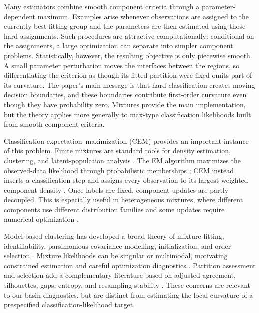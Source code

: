 \documentclass[12pt,a4paper]{article}
\theoremstyle{definition}
\theoremstyle{remark}
\begin{document}
Many estimators combine smooth component criteria through a parameter-dependent
maximum.  Examples arise whenever observations are assigned to the currently
best-fitting group and the parameters are then estimated using those hard
assignments.  Such procedures are attractive computationally: conditional on
the assignments, a large optimization can separate into simpler component
problems.  Statistically, however, the resulting objective is only piecewise
smooth.  A small parameter perturbation moves the interfaces between the
regions, so differentiating the criterion as though its fitted partition were
fixed omits part of its curvature.
The paper's main message is that hard classification creates moving decision
boundaries, and these boundaries contribute first-order curvature even though
they have probability zero.  Mixtures provide the main implementation, but
the theory applies more generally to max-type classification likelihoods built
from smooth component criteria.

Classification expectation--maximization (CEM) provides an important instance
of this problem.  Finite mixtures are standard tools for density estimation,
clustering, and latent-population analysis \citep{mclachlan2000finite}.  The EM
algorithm maximizes the observed-data likelihood through probabilistic
memberships \citep{dempster1977maximum}; CEM instead inserts a classification
step and assigns every observation to its largest weighted component density
\citep{celeux1992classification}.  Once labels are fixed, component updates
are partly decoupled.  This is especially useful in heterogeneous mixtures,
where different components use different distribution families and some
updates require numerical optimization \citep{pal2026flexible}.

Model-based clustering has developed a broad theory of mixture fitting,
identifiability, parsimonious covariance modelling, initialization, and order
selection \citep{titterington1985statistical,redner1984mixture,
banfield1993model,fraley2002model,keribin2000consistent}. Mixture likelihoods
can be singular or multimodal, motivating constrained estimation and careful
optimization diagnostics \citep{hathaway1985constrained,chen1995optimal,
mclachlan2008em}. Partition assessment and selection add a complementary
literature based on adjusted agreement, silhouettes, gaps, entropy, and
resampling stability \citep{hubert1985comparing,rousseeuw1987silhouettes,
tibshirani2001gap,celeux1996entropy,benhur2002stability,fang2012selection}.
These concerns are relevant to our basin diagnostics, but are distinct from
estimating the local curvature of a prespecified classification-likelihood
target.
\end{document}
